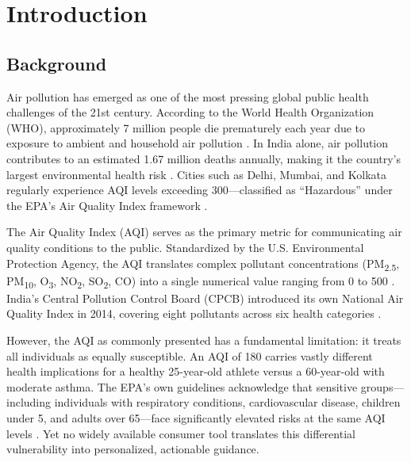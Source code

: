 \documentclass[12pt,a4paper]{report}
\begin{document}
\newpage
{}

\chapter{Introduction}

\section{Background}

Air pollution has emerged as one of the most pressing global public health challenges of the 21st century. According to the World Health Organization (WHO), approximately 7 million people die prematurely each year due to exposure to ambient and household air pollution \cite{WHO2014airpollution}. In India alone, air pollution contributes to an estimated 1.67 million deaths annually, making it the country's largest environmental health risk \cite{CPCB2014naqi}. Cities such as Delhi, Mumbai, and Kolkata regularly experience AQI levels exceeding 300---classified as ``Hazardous'' under the EPA's Air Quality Index framework \cite{EPA2024aqitechnical}.

The Air Quality Index (AQI) serves as the primary metric for communicating air quality conditions to the public. Standardized by the U.S. Environmental Protection Agency, the AQI translates complex pollutant concentrations (PM\textsubscript{2.5}, PM\textsubscript{10}, O\textsubscript{3}, NO\textsubscript{2}, SO\textsubscript{2}, CO) into a single numerical value ranging from 0 to 500 \cite{CFR40appendixG}. India's Central Pollution Control Board (CPCB) introduced its own National Air Quality Index in 2014, covering eight pollutants across six health categories \cite{CPCB2014naqi}.

However, the AQI as commonly presented has a fundamental limitation: it treats all individuals as equally susceptible. An AQI of 180 carries vastly different health implications for a healthy 25-year-old athlete versus a 60-year-old with moderate asthma. The EPA's own guidelines acknowledge that sensitive groups---including individuals with respiratory conditions, cardiovascular disease, children under 5, and adults over 65---face significantly elevated risks at the same AQI levels \cite{EPA2024healtheffects}. Yet no widely available consumer tool translates this differential vulnerability into personalized, actionable guidance.
\end{document}

